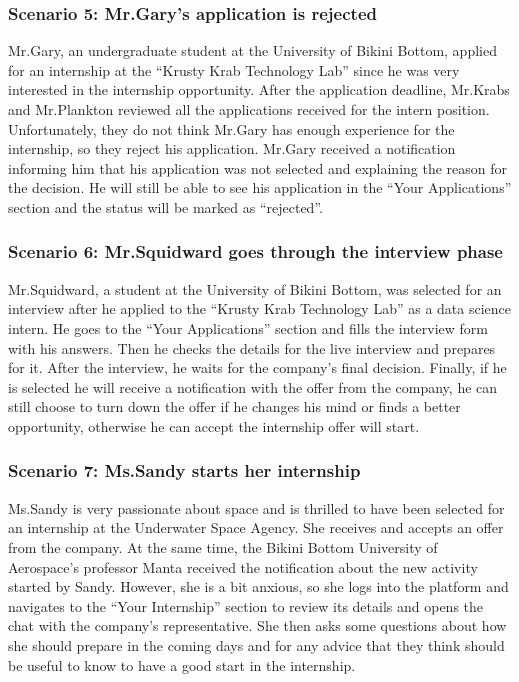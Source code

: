\subsubsection{Scenario 5: Mr.Gary's application is rejected}\label{subsubsec:scenario_5}
Mr.Gary, an undergraduate student at the University of Bikini Bottom, applied for an internship at the ``Krusty Krab Technology Lab'' since he was very 
interested in the internship opportunity. After the application deadline, Mr.Krabs and Mr.Plankton reviewed all the applications received for the intern 
position. Unfortunately, they do not think Mr.Gary has enough experience for the internship, so they reject his application. Mr.Gary received a 
notification informing him that his application was not selected and explaining the reason for the decision. He will still be able to see his application 
in the ``Your Applications'' section and the status will be marked as ``rejected''.

\subsubsection{Scenario 6: Mr.Squidward goes through the interview phase}\label{subsubsec:scenario_6}
Mr.Squidward, a student at the University of Bikini Bottom, was selected for an interview after he applied to the ``Krusty Krab Technology 
Lab'' as a data science intern. He goes to the ``Your Applications'' section and fills the interview form with his answers. Then he checks the details for the 
live interview and prepares for it. After the interview, he waits for the company's final decision. Finally, if he is selected he will receive a notification 
with the offer from the company, he can still choose to turn down the offer if he changes his mind or finds a better opportunity, otherwise he can accept the 
internship offer will start.

\subsubsection{Scenario 7: Ms.Sandy starts her internship}\label{subsubsec:scenario_7}
Ms.Sandy is very passionate about space and is thrilled to have been selected for an internship at the Underwater Space Agency. She receives 
and accepts an offer from the company. At the same time, the Bikini Bottom University of Aerospace's professor Manta received the notification
about the new activity started by Sandy. However, she is a bit anxious, so she logs into the platform and navigates to the ``Your Internship'' 
section to review its details and opens the chat with the company's representative. She then asks some questions about how she should prepare in the 
coming days and for any advice that they think should be useful to know to have a good start in the internship.

